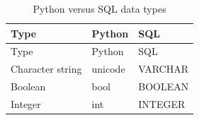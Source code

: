 \documentclass[
]{book}
\theoremstyle{definition}
\theoremstyle{definition}
\theoremstyle{definition}
\theoremstyle{remark}
\begin{document}
\begin{longtable}[]{@{}lll@{}}
\caption{Python versus SQL data types}\tabularnewline
\toprule
\begin{minipage}[b]{0.30\columnwidth}\raggedright
Type\strut
\end{minipage} & \begin{minipage}[b]{0.30\columnwidth}\raggedright
Python\strut
\end{minipage} & \begin{minipage}[b]{0.30\columnwidth}\raggedright
SQL\strut
\end{minipage}\tabularnewline
\midrule
\endfirsthead
\toprule
\begin{minipage}[b]{0.30\columnwidth}\raggedright
Type\strut
\end{minipage} & \begin{minipage}[b]{0.30\columnwidth}\raggedright
Python\strut
\end{minipage} & \begin{minipage}[b]{0.30\columnwidth}\raggedright
SQL\strut
\end{minipage}\tabularnewline
\midrule
\endhead
\begin{minipage}[t]{0.30\columnwidth}\raggedright
Character string\strut
\end{minipage} & \begin{minipage}[t]{0.30\columnwidth}\raggedright
unicode\strut
\end{minipage} & \begin{minipage}[t]{0.30\columnwidth}\raggedright
VARCHAR\strut
\end{minipage}\tabularnewline
\begin{minipage}[t]{0.30\columnwidth}\raggedright
Boolean\strut
\end{minipage} & \begin{minipage}[t]{0.30\columnwidth}\raggedright
bool\strut
\end{minipage} & \begin{minipage}[t]{0.30\columnwidth}\raggedright
BOOLEAN\strut
\end{minipage}\tabularnewline
\begin{minipage}[t]{0.30\columnwidth}\raggedright
Integer\strut
\end{minipage} & \begin{minipage}[t]{0.30\columnwidth}\raggedright
int\strut
\end{minipage} & \begin{minipage}[t]{0.30\columnwidth}\raggedright
INTEGER\strut
\end{minipage}\tabularnewline

\end{longtable}
\end{document}
